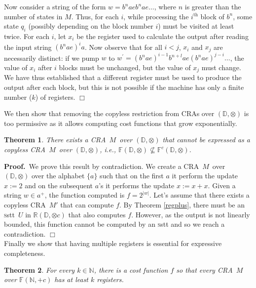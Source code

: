 \documentclass[11pt]{article}
\newtheorem{theorem}{Theorem}
\def\Proof{{\bf Proof.}}
\def\qed{{\bf $\Box$}}
\def\qed{{\bf $\Box$}}
\newcommand{\domain}{\ensuremath{\mathbb{D}}}
\newcommand{\Nat}{\ensuremath{\mathbb{N}}}
\newcommand{\CF}{{\mathbb F}}
\newcommand{\CCF}{{\mathbb F}^c}
\newcommand{\reg}[1]{{\mathbb R}(#1)}
\newcommand{\SSTT}{{\sc\textsc sstt}\xspace}
\newcommand{\stt}{\ensuremath{U}}
\newcommand{\EDWA}{{CRA}\xspace}
\newcommand{\edwa}{\ensuremath{M}}
\newcommand{\ie}{{\em i.e.}\xspace}
\def\myplus{\otimes}
\begin{document}
Now consider a string of the form $w=b^{n}aeb^{n}ae\ldots$, where
$n$ is greater than the number of states in $M$. Thus, for each
$i$, while processing the $i^{\mbox{th}}$ block of $b^{n}$, some
state $q_{i}$ (possibly depending on the block number $i$) must
be visited at least twice. For each $i$, let $x_{i}$ be the register
used to calculate the output after reading the input string $\left(b^{n}ae\right)^{i}a$.
Now observe that for all $i<j$, $x_{i}$ and $x_{j}$ are necessarily
distinct: if we pump $w$ to $w^{\prime}=\left(b^{n}ae\right)^{i-1}b^{n+l}ae\left(b^{n}ae\right)^{j-i}\ldots$,
the value of $x_{i}$ after $i$ blocks must be unchanged, but the
value of $x_{j}$ must change. We have thus established that a different
register must be used to produce the output after each block, but
this is not possible if the machine has only a finite number ($k$)
of registers.
\qed

We then show that removing the copyless restriction from CRAs over
$(\domain, \myplus)$ is too permissive as it allows computing cost
functions that grow exponentially.

\begin{theorem}
\label{mvcmtomvcmr}
There exists a \EDWA~\edwa~over $(\domain,\myplus)$ that cannot be
expressed as a copyless \EDWA~\edwa~over $(\domain,\myplus)$, \ie,
$\CF(\domain,\myplus)\nsubseteq\CCF(\domain,\myplus)$.
\end{theorem}

\Proof~We prove this result by contradiction.  We create a
\EDWA~\edwa~over $(\domain,\myplus)$ over the alphabet $\{a\}$ such
that on the first $a$ it perform the update $x:=2$ and on the
subsequent $a$'s it performs the update $x:=x+x$. Given a string $w\in
a^+$, the function computed is $f=2^{|w|}$.  Let's assume that there
exists a copyless \EDWA~$\edwa'$ that can compute $f$.  By Theorem
\ref{regplus}, there must be an \SSTT~$\stt$ in $\reg{\domain, \myplus
c}$ that also computes $f$.  However, as the output is not linearly
bounded, this function cannot be computed by an \SSTT and so we reach
a contradiction.  \qed \\

Finally we show that having multiple registers is essential for
expressive completeness.

\begin{theorem}\label{kvar}
For every $k\in\mathbb{N}$, there is a cost function $f$ so that every
\EDWA~$M$ over $\CF(\Nat,+c)$ has at least $k$ registers.
\end{theorem}
\end{document}
